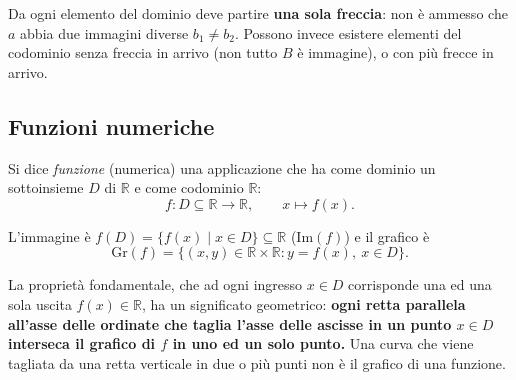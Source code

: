 \documentclass[11pt,a4paper]{article}
\begin{document}
\begin{osservazione}
Da ogni elemento del dominio deve partire \textbf{una sola freccia}: non è ammesso che $a$ abbia due immagini diverse $b_1 \neq b_2$. Possono invece esistere elementi del codominio senza freccia in arrivo (non tutto $B$ è immagine), o con più frecce in arrivo.
\end{osservazione}

\begin{center}
\end{center}

\subsection{Funzioni numeriche}

\begin{definizione}
Si dice \emph{funzione} (numerica) una applicazione che ha come dominio un sottoinsieme $D$ di $\mathbb{R}$ e come codominio $\mathbb{R}$:
\[
f : D \subseteq \mathbb{R} \to \mathbb{R}, \qquad x \mapsto f(x).
\]
\end{definizione}

L'immagine è $f(D) = \{f(x) \mid x \in D\} \subseteq \mathbb{R}$ ($\mathrm{Im}(f)$) e il grafico è
\[
\mathrm{Gr}(f) = \{(x, y) \in \mathbb{R} \times \mathbb{R} : y = f(x),\ x \in D\}.
\]

La proprietà fondamentale, che ad ogni ingresso $x \in D$ corrisponde una ed una sola uscita $f(x) \in \mathbb{R}$, ha un significato geometrico: \textbf{ogni retta parallela all'asse delle ordinate che taglia l'asse delle ascisse in un punto $x \in D$ interseca il grafico di $f$ in uno ed un solo punto.} Una curva che viene tagliata da una retta verticale in due o più punti non è il grafico di una funzione.
\end{document}
